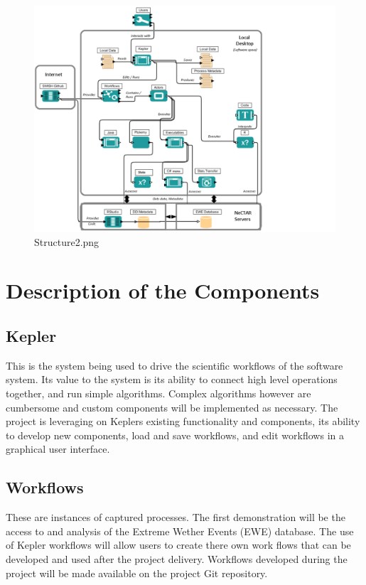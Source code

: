 \documentclass[a4paper]{article}
\begin{document}
\begin{figure}[!h]
\centering
\includegraphics[width=\textwidth]{Structure2.png}
\caption{Structure2.png}
\label{fig:Structure2.png}
\end{figure}
\clearpage
\section{Description of the Components}
\label{sec-3}
\subsection{Kepler}
\label{sec-3-1}

This is the system being used to drive the scientific workflows of the software system. Its value to the system is its ability to connect high level operations together, and run simple algorithms. Complex algorithms however are cumbersome and custom components will be implemented as necessary. The project is leveraging on Keplers existing functionality and components, its ability to develop new components, load and save workflows, and edit workflows in a graphical user interface.
\subsection{Workflows}
\label{sec-3-2}

These are instances of captured processes. The first demonstration will be the access to and analysis of the Extreme Wether Events (EWE) database. The use of Kepler workflows will allow users to create there own work flows that can be developed and used after the project delivery. Workflows developed during the project will be made available on the project Git repository.
\end{document}
